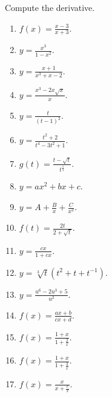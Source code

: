 Compute the derivative.
\begin{multicols}{2}
\begin{enumerate}[ref={\fcProblemRef}]

\item $\displaystyle f(x)=\frac{x-3}{x+3}$.

\item $\displaystyle y=\frac{x^3}{1-x^2}$.

\item $\displaystyle y=\frac{x+1}{x^3+x-2}$.

\item $\displaystyle y=\frac{x^3-2x\sqrt{x}}{x}$.

\item \label{problemd/dt(t/(t-1)^2)}  $\displaystyle y=\frac{t}{(t-1)^2}$.

\item $\displaystyle y=\frac{t^2+2}{t^4-3t^2+1}$.

\item $\displaystyle g(t)=\frac{t-\sqrt{t}}{t^{\frac{1}{3}}}$.

\item $\displaystyle y=a x^2+b x + c$.

\item $\displaystyle y=A+\frac{B}x +\frac{C}{x^2}$.

\item $\displaystyle f(t)=\frac{2t}{2+\sqrt{t}}$.

\item $\displaystyle y=\frac{c x}{1+c x}$.

\item $\displaystyle y=\sqrt[3]{t}(t^2+t+t^{-1}) $.

\item $\displaystyle y=\frac{u^6-2u^3+5}{u^2}$.

\item $\displaystyle f(x)=\frac{a x+b}{c x+ d}$.

\item $\displaystyle f(x)=\frac{1+x }{1+\frac{2}x}$. 

\item $\displaystyle f(x)=\frac{1+x }{1+\frac{3}x}$. 

\item $\displaystyle f(x)=\frac{x}{x+\frac{c}{x}}$.

\end{enumerate}
\end{multicols}
